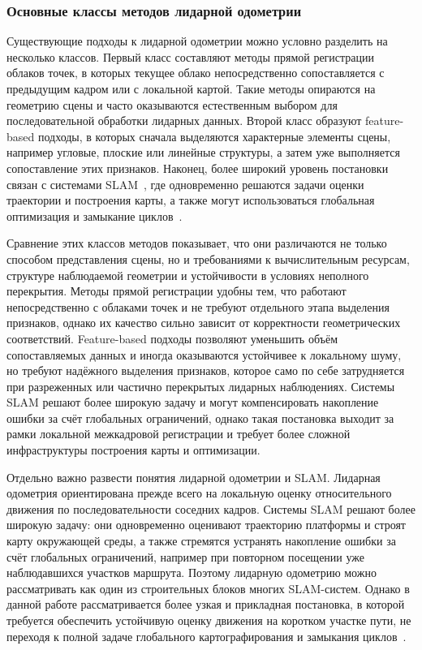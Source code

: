 \subsubsection{Основные классы методов лидарной одометрии}

Существующие подходы к лидарной одометрии можно условно разделить на несколько классов. Первый класс составляют методы прямой регистрации облаков точек, в которых текущее облако непосредственно сопоставляется с предыдущим кадром или с локальной картой. Такие методы опираются на геометрию сцены и часто оказываются естественным выбором для последовательной обработки лидарных данных. Второй класс образуют feature-based подходы, в которых сначала выделяются характерные элементы сцены, например угловые, плоские или линейные структуры, а затем уже выполняется сопоставление этих признаков. Наконец, более широкий уровень постановки связан с системами SLAM~\cite{slam-cadena}, где одновременно решаются задачи оценки траектории и построения карты, а также могут использоваться глобальная оптимизация и замыкание циклов~\cite{ct-icp-dellenbach}.

Сравнение этих классов методов показывает, что они различаются не только способом представления сцены, но и требованиями к вычислительным ресурсам, структуре наблюдаемой геометрии и устойчивости в условиях неполного перекрытия. Методы прямой регистрации удобны тем, что работают непосредственно с облаками точек и не требуют отдельного этапа выделения признаков, однако их качество сильно зависит от корректности геометрических соответствий. Feature-based подходы позволяют уменьшить объём сопоставляемых данных и иногда оказываются устойчивее к локальному шуму, но требуют надёжного выделения признаков, которое само по себе затрудняется при разреженных или частично перекрытых лидарных наблюдениях. Системы SLAM решают более широкую задачу и могут компенсировать накопление ошибки за счёт глобальных ограничений, однако такая постановка выходит за рамки локальной межкадровой регистрации и требует более сложной инфраструктуры построения карты и оптимизации.

Отдельно важно развести понятия лидарной одометрии и SLAM. Лидарная одометрия ориентирована прежде всего на локальную оценку относительного движения по последовательности соседних кадров. Системы SLAM решают более широкую задачу: они одновременно оценивают траекторию платформы и строят карту окружающей среды, а также стремятся устранять накопление ошибки за счёт глобальных ограничений, например при повторном посещении уже наблюдавшихся участков маршрута. Поэтому лидарную одометрию можно рассматривать как один из строительных блоков многих SLAM-систем. Однако в данной работе рассматривается более узкая и прикладная постановка, в которой требуется обеспечить устойчивую оценку движения на коротком участке пути, не переходя к полной задаче глобального картографирования и замыкания циклов~\cite{ct-icp-dellenbach}.


